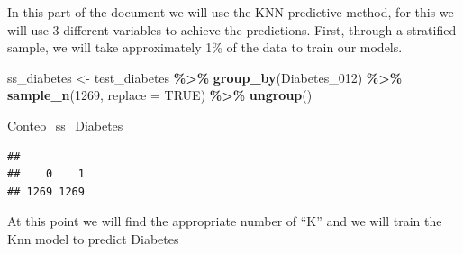 \documentclass[
]{article}
\newenvironment{Shaded}{\begin{snugshade}}{\end{snugshade}}
\newcommand{\AttributeTok}[1]{\textcolor[rgb]{0.13,0.29,0.53}{#1}}
\newcommand{\ConstantTok}[1]{\textcolor[rgb]{0.56,0.35,0.01}{#1}}
\newcommand{\DecValTok}[1]{\textcolor[rgb]{0.00,0.00,0.81}{#1}}
\newcommand{\FunctionTok}[1]{\textcolor[rgb]{0.13,0.29,0.53}{\textbf{#1}}}
\newcommand{\NormalTok}[1]{#1}
\newcommand{\OtherTok}[1]{\textcolor[rgb]{0.56,0.35,0.01}{#1}}
\newcommand{\SpecialCharTok}[1]{\textcolor[rgb]{0.81,0.36,0.00}{\textbf{#1}}}
\begin{document}
In this part of the document we will use the KNN predictive method, for
this we will use 3 different variables to achieve the predictions.
First, through a stratified sample, we will take approximately 1\% of
the data to train our models.

\begin{Shaded}
\begin{Highlighting}[]
\NormalTok{ss\_diabetes }\OtherTok{\textless{}{-}}\NormalTok{ test\_diabetes }\SpecialCharTok{\%\textgreater{}\%}
  \FunctionTok{group\_by}\NormalTok{(Diabetes\_012) }\SpecialCharTok{\%\textgreater{}\%}
  \FunctionTok{sample\_n}\NormalTok{(}\DecValTok{1269}\NormalTok{, }\AttributeTok{replace =} \ConstantTok{TRUE}\NormalTok{) }\SpecialCharTok{\%\textgreater{}\%}
  \FunctionTok{ungroup}\NormalTok{()}
\end{Highlighting}
\end{Shaded}

\begin{Shaded}
\begin{Highlighting}[]
\NormalTok{Conteo\_ss\_Diabetes}
\end{Highlighting}
\end{Shaded}

\begin{verbatim}
## 
##    0    1 
## 1269 1269
\end{verbatim}

At this point we will find the appropriate number of ``K'' and we will
train the Knn model to predict Diabetes
\end{document}
